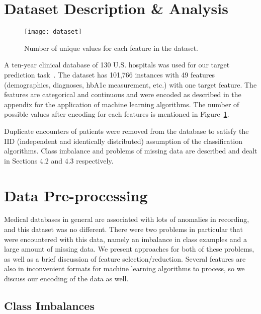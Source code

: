 \documentclass[conference]{IEEEtran}
\begin{document}
\section{Dataset Description \& Analysis}


\begin{figure}[htpb]
	\centering
	\texttt{[image: dataset]}
	\caption{Number of unique values for each feature in the dataset.}
	\label{fig:dataset}
\end{figure}

A ten-year clinical database of 130 U.S. hospitals was used for our target prediction task~\cite{dataset-2014, hba1c-2014}. The dataset has 101,766 instances with 49 features (demographics, diagnoses, hbA1c measurement, etc.) with one target feature. The features are categorical and continuous and were encoded as described in the appendix for the application of machine learning algorithms. The number of possible values after encoding for each features is mentioned in Figure~\ref{fig:dataset}.

Duplicate encounters of patients were removed from the database to satisfy the IID (independent and identically distributed) assumption of the classification algorithms. Class imbalance and problems of missing data are described and dealt in Sections 4.2 and 4.3 respectively.

\section{Data Pre-processing}


Medical databases in general are associated with lots of anomalies in recording, and this dataset was no different. There were two problems in particular that were encountered with this data, namely an imbalance in class examples and a large amount of missing data. We present approaches for both of these problems, as well as a brief discussion of feature selection/reduction. Several features are also in inconvenient formats for machine learning algorithms to process, so we discuss our encoding of the data as well.

\subsection{Class Imbalances}
\end{document}

